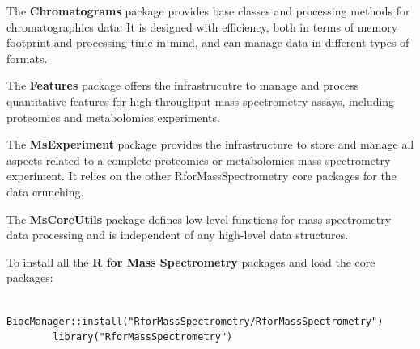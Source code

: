 \documentclass[final]{beamer}
\newcommand{\bpkg}[1]{{\textbf{#1}}}
\begin{document}
\begin{frame}[fragile]
\begin{columns}[T]
\begin{column}{.67\textwidth}
{      \vspace{1cm}
      
      \begin{block}{}
        \justifying The \bpkg{Chromatograms} package provides base
        classes and processing methods for chromatographics data. It
        is designed with efficiency, both in terms of memory footprint
        and processing time in mind, and can manage data in different
        types of formats.
      \end{block}

      \vspace{1cm}
      
      \begin{block}{}
        \justifying The \bpkg{Features} package offers the
        infrastrucutre to manage and process quantitative features for
        high-throughput mass spectrometry assays, including proteomics
        and metabolomics experiments.
      \end{block}

      \vspace{1cm}
      
      \begin{block}{}
        \justifying The \bpkg{MsExperiment} package provides the
        infrastructure to store and manage all aspects related to a
        complete proteomics or metabolomics mass spectrometry
        experiment. It relies on the other RforMassSpectrometry core
        packages for the data crunching.
      \end{block}

      \vspace{1cm}
      
      \begin{block}{}
        \justifying The \bpkg{MsCoreUtils} package defines low-level
        functions for mass spectrometry data processing and is
        independent of any high-level data structures.
      \end{block}
      }

      \vspace{3cm}
      
      To install all the \textbf{R for Mass Spectrometry} packages
      and load the core packages:

      \vspace{5mm}
        
      \begin{lstlisting}
        BiocManager::install("RforMassSpectrometry/RforMassSpectrometry")
        library("RforMassSpectrometry")
      \end{lstlisting}


\end{column}
\end{columns}
\end{frame}
\end{document}
